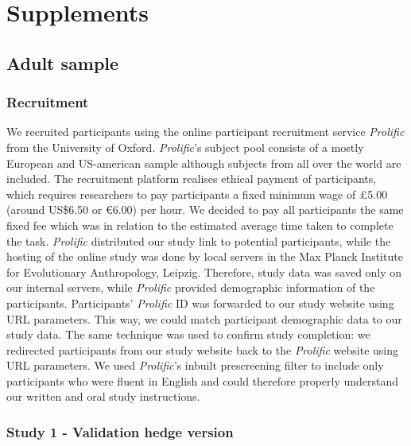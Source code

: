 \documentclass[
  english,
  man,floatsintext]{apa6}
\begin{document}
\endgroup

\newpage

\hypertarget{supplements}{%
\section{Supplements}\label{supplements}}

\hypertarget{adult-sample}{%
\subsection{Adult sample}\label{adult-sample}}

\hypertarget{recruitment}{%
\subsubsection{Recruitment}\label{recruitment}}

We recruited participants using the online participant recruitment service \emph{Prolific} from the University of Oxford. \emph{Prolific}'s subject pool consists of a mostly European and US-american sample although subjects from all over the world are included. The recruitment platform realises ethical payment of participants, which requires researchers to pay participants a fixed minimum wage of £5.00 (around US\$6.50 or €6.00) per hour. We decided to pay all participants the same fixed fee which was in relation to the estimated average time taken to complete the task.
\emph{Prolific} distributed our study link to potential participants, while the hosting of the online study was done by local servers in the Max Planck Institute for Evolutionary Anthropology, Leipzig. Therefore, study data was saved only on our internal servers, while \emph{Prolific} provided demographic information of the participants.
Participants' \emph{Prolific} ID was forwarded to our study website using URL parameters. This way, we could match participant demographic data to our study data. The same technique was used to confirm study completion: we redirected participants from our study website back to the \emph{Prolific} website using URL parameters.
We used \emph{Prolific}'s inbuilt prescreening filter to include only participants who were fluent in English and could therefore properly understand our written and oral study instructions.

\hypertarget{study-1---validation-hedge-version}{%
\subsubsection{Study 1 - Validation hedge version}\label{study-1---validation-hedge-version}}
\end{document}
